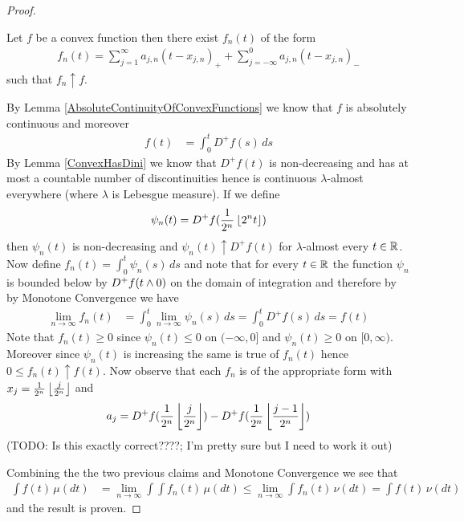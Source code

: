 \begin{proof}
\begin{clm}Let $f$ be a convex function then there exist $f_n(t)$ of the form 
\begin{align*}
f_n(t) = \sum_{j=1}^{\infty} a_{j,n} (t - x_{j,n})_+ + \sum_{j=-\infty}^{0} a_{j,n} (t - x_{j,n})_-
\end{align*}
such that $f_n \uparrow f$.
\end{clm}
By Lemma \ref{AbsoluteContinuityOfConvexFunctions} we know that $f$ is
absolutely continuous and moreover
\begin{align*}
f(t) &= \int_0^t D^+f(s) \, ds
\end{align*}
By Lemma \ref{ConvexHasDini} we know that $D^+f(t)$ is non-decreasing and has at most a countable number of discontinuities hence is continuous $\lambda$-almost everywhere (where $\lambda$ is Lebesgue measure).  If we define 
\begin{align*}
\psi_n(t) = D^+f(\frac{1}{2^n} \left \lfloor 2^n t \right \rfloor)
\end{align*}
then $\psi_n(t)$ is non-decreasing and $\psi_n(t) \uparrow D^+f(t)$ for $\lambda$-almost every $t \in \mathbb{R}$.  Now define $f_n(t) = \int_0^t \psi_n(s) \, ds$ and note that for every $t \in \mathbb{R}$ the function $\psi_n$ is bounded below by $D^+f(t \wedge 0)$ on the domain of integration and therefore by by Monotone Convergence we have 
\begin{align*}
\lim_{n \to \infty} f_n(t) &= \int_0^t \lim_{n \to \infty} \psi_n(s) \, ds = \int_0^t D^+f(s) \, ds  = f(t)
\end{align*}
Note that $f_n(t) \geq 0$ since $\psi_n(t) \leq 0$ on $(-\infty, 0]$ and $\psi_n(t) \geq 0$ on $[0, \infty)$.  Moreover since $\psi_n(t)$ is increasing the same is true of $f_n(t)$ hence $0 \leq f_n(t) \uparrow f(t)$.  Now observe that each $f_n$ is of the appropriate form with $x_j = \frac{1}{2^n}\left \lfloor \frac{j}{2^n} \right \rfloor$ and 
\begin{align*}
a_j =  D^+f(\frac{1}{2^n}\left \lfloor \frac{j}{2^n} \right \rfloor) -  D^+f(\frac{1}{2^n}\left \lfloor \frac{j-1}{2^n} \right \rfloor)
\end{align*}  
(TODO: Is this exactly correct????;  I'm pretty sure but I need to work it out)

Combining the the two previous claims and Monotone Convergence we see that
\begin{align*}
\int f(t) \, \mu(dt) &= \lim_{n \to \infty} \int \int f_n(t) \, \mu(dt) \leq \lim_{n \to \infty} \int f_n(t) \, \nu(dt) = \int f(t) \, \nu(dt)
\end{align*}
and the result is proven.
\end{proof}

